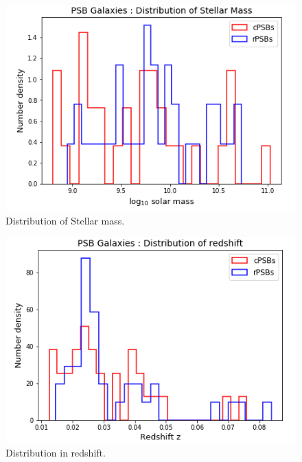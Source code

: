 \begin{figure}
    \centering
    \includegraphics[width=\columnwidth]{images/JupyterPlots/Stellar-mass-distribution.png}
    \caption{Distribution of Stellar mass.}
    \label{fig:stellar-mass-plot}
\end{figure}

\begin{figure}
    \centering
    \includegraphics[width=\columnwidth]{images/JupyterPlots/Redshift-distribution.png}
    \caption{Distribution in redshift.}
    \label{fig:redshift-plot}
\end{figure}

